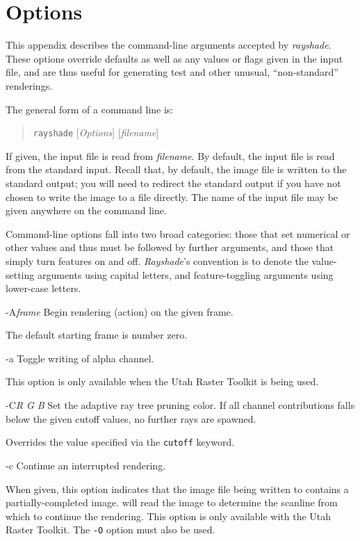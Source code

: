 \chapter{Options}

This appendix describes the command-line arguments accepted by {\em rayshade}.
These options override defaults
as well as any values or flags given in the input file,
and are thus useful for generating test and other unusual, ``non-standard''
renderings.

The general form of a \rayshade command line is:
\begin{quote}
{\tt rayshade} [{\em Options}] [{\em filename}]
\end{quote}

If given, the input file is read from {\em filename}.  By default,
the input file is read from the standard input.
Recall that, by default, the image file is written to the standard
output; you will need to redirect the standard output if you have not
chosen to write the image to a file directly.  The name of the input
file may be given anywhere on the command line.

Command-line options fall into two broad categories: those that set
numerical or other values and thus must be followed by further arguments,
and those that simply turn features on and off.  {\em Rayshade}'s
convention is to denote the value-setting arguments using capital letters,
and feature-toggling arguments using lower-case letters.

\begin{defkey}{-A}{{\em frame}}
	Begin rendering (action) on the given frame.
\end{defkey}
The default starting frame is number zero.

\begin{defkey}{-a}{}
	Toggle writing of alpha channel.
\end{defkey}
This option is only available when the Utah Raster Toolkit is
being used.

\begin{defkey}{-C}{{\em R G B}}
	Set the adaptive ray tree pruning color.  If all
	channel contributions falls below the given cutoff
	values, no further rays are spawned.
\end{defkey}
Overrides the value specified via the {\tt cutoff} keyword.

\begin{defkey}{-c}{}
	Continue an interrupted rendering.
\end{defkey}
When given, this option indicates that the image file being written
to contains a partially-completed image.  \Rayshade will read the
image to determine the scanline from which to continue the rendering.
This option is only available with the Utah Raster Toolkit.
The {\tt -O} option must also be used.

